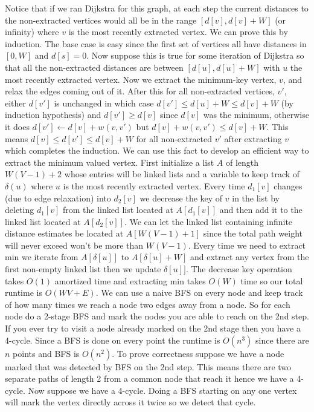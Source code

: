 \documentclass[12pt,twoside]{article}
\begin{document}
\begin{problems}
Notice that if we ran Dijkstra for this graph, at each step the current distances to the non-extracted vertices would all be in the range $[d[v],d[v]+W]$ (or infinity)  where $v$ is the most recently extracted vertex. We can prove this by induction. The base case is easy since the first set of vertices all have distances in $[0, W]$ and $d[s]=0$. Now suppose this is true for some iteration of Dijkstra so that all the non-extracted distances are between $[d[u],d[u]+W]$ with $u$ the most recently extracted vertex. Now we extract the minimum-key vertex, $v$, and relax the edges coming out of it. After this for all non-extracted vertices, $v'$, either $d[v']$ is unchanged in which case $d[v']\leq d[u]+W\leq d[v]+W$ (by induction hypothesis) and $d[v']\geq d[v]$ since $d[v]$ was the minimum, otherwise it does $d[v']\leftarrow d[v]+w(v,v')$ but $d[v]+w(v,v')\leq d[v]+W$. This means $d[v]\leq d[v']\leq d[v]+W  $ for all non-extracted $v'$ after extracting $v$ which completes the induction.  We can use this fact to develop an efficient way to extract the minimum valued vertex. First initialize a list $A$ of length $W(V-1)+2$ whose entries will be linked lists and a variable to keep track of $\delta(u)$ where $u$ is the most recently extracted vertex. Every time $d_1[v]$ changes (due to edge relaxation)  into $d_2[v]$ we decrease the key of  $v$ in the list by deleting $d_1[v]$ from the linked list located at $A[d_1[v]]$ and then add it to the linked list located at $A[d_2[v]]$. We can let the linked list containing infinite distance estimates be located at $A[W(V-1)+1]$ since the total path weight will never exceed won't be more than $W(V-1)$. Every time we need to extract min we iterate from $A[\delta[u]]$ to $A[\delta[u]+W]$ and extract any vertex from the first non-empty linked list then we update $\delta[u]]$. The decrease key operation takes $O(1)$ amortized time and extracting min takes $O(W)$ time so our total runtime is $O(WV+E)$.
\problem We can use a naive BFS on every node and keep track of how many times we reach a node two edges away from a node. So for each node do a 2-stage BFS and mark the nodes you are able to reach on the 2nd step. If you ever try to visit a node already marked on the 2nd stage then you have a 4-cycle. Since a BFS is done on every point the runtime is $O(n^3)$ since there are $n$ points and BFS is $O(n^2)$. To prove correctness suppose we have a node marked that was detected by BFS on the 2nd step. This means there are two separate paths of length 2 from a common node that reach it hence we have a 4-cycle. Now suppose we have a 4-cycle. Doing a BFS starting on any one vertex will mark  the vertex directly across it twice so we detect that cycle.

\end{problems}
\end{document}
